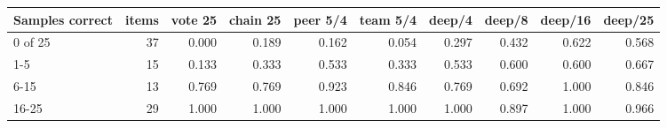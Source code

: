 \begin{tabular}{lrrrrrrrrr}
\toprule
Samples correct & items & vote 25 & chain 25 & peer 5/4 & team 5/4 & deep/4 & deep/8 & deep/16 & deep/25 \\ \midrule
0 of 25 & 37 & 0.000 & 0.189 & 0.162 & 0.054 & 0.297 & 0.432 & 0.622 & 0.568 \\
1-5 & 15 & 0.133 & 0.333 & 0.533 & 0.333 & 0.533 & 0.600 & 0.600 & 0.667 \\
6-15 & 13 & 0.769 & 0.769 & 0.923 & 0.846 & 0.769 & 0.692 & 1.000 & 0.846 \\
16-25 & 29 & 1.000 & 1.000 & 1.000 & 1.000 & 1.000 & 0.897 & 1.000 & 0.966 \\
\bottomrule
\end{tabular}
